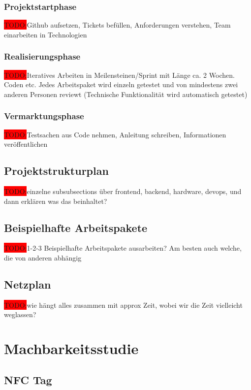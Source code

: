 \documentclass[10pt, a4paper]{article}
\begin{document}
\subsubsection{Projektstartphase}
\colorbox{red}{TODO:}Github aufsetzen, Tickets befüllen, Anforderungen verstehen, Team einarbeiten in Technologien

\subsubsection{Realisierungsphase}
\colorbox{red}{TODO:}Iteratives Arbeiten in Meilensteinen/Sprint mit Länge ca. 2 Wochen. Coden etc. Jedes Arbeitspaket wird einzeln getestet und von mindestens zwei anderen Personen reviewt (Technische Funktionalität wird automatisch getestet)

\subsubsection{Vermarktungsphase}
\colorbox{red}{TODO:}Testsachen aus Code nehmen, Anleitung schreiben, Informationen veröffentlichen

\subsection{Projektstrukturplan}
\colorbox{red}{TODO:}einzelne subsubsections über frontend, backend, hardware, devops, und dann erklären was das beinhaltet?

\subsection{Beispielhafte Arbeitspakete}
\colorbox{red}{TODO:}1-2-3 Beispielhafte Arbeitspakete ausarbeiten? Am besten auch welche, die von anderen abhängig

\subsection{Netzplan}
\colorbox{red}{TODO:}wie hängt alles zusammen mit approx Zeit, wobei wir die Zeit vielleicht weglassen?

\section{Machbarkeitsstudie}

\subsection{NFC Tag}
\end{document}

